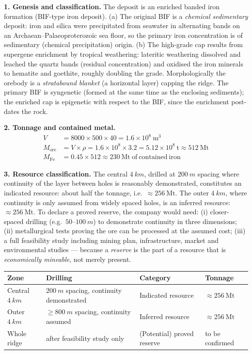 \documentclass[11pt]{article}
\newcommand{\cle}[1]{{\popxbold\color{popdark}#1}}
\newcounter{popsec}
\newcounter{popsub}
\newcommand{\courssub}[1]{%
  \stepcounter{popsub}%
  \par\vspace{9pt}\noindent{\popxbold\fontsize{11.5}{13}\selectfont\color{popink}{\color{poporange}\thepopsec.\thepopsub}\hspace{6pt}#1}\par\nopagebreak\vspace{4pt}
}
\begin{document}
\courssub{Model answer}

\textbf{1. Genesis and classification.} The deposit is an \cle{enriched banded iron formation} (BIF-type iron deposit). (a) The original BIF is a \emph{chemical sedimentary} deposit: iron and silica were precipitated from seawater in alternating bands on an Archaean--Palaeoproterozoic sea floor, so the primary iron concentration is of \cle{sedimentary (chemical precipitation)} origin. (b) The high-grade cap results from \cle{supergene enrichment by tropical weathering}: lateritic weathering dissolved and leached the quartz bands (residual concentration) and oxidised the iron minerals to hematite and goethite, roughly doubling the grade. Morphologically the orebody is a \emph{stratabound blanket} (a horizontal layer) capping the ridge. The primary BIF is \cle{syngenetic} (formed at the same time as the enclosing sediments); the enriched cap is \cle{epigenetic} with respect to the BIF, since the enrichment post-dates the rock.

\textbf{2. Tonnage and contained metal.}
\begin{align*}
V &= 8000 \times 500 \times 40 = 1.6\times 10^{8}\ \mathrm{m^{3}}\\
M_{\text{ore}} &= V \times \rho = 1.6\times 10^{8} \times 3.2 = 5.12\times 10^{8}\ \mathrm{t} \approx 512\ \mathrm{Mt}\\
M_{\text{Fe}} &= 0.45 \times 512 \approx 230\ \mathrm{Mt\ of\ contained\ iron}
\end{align*}

\textbf{3. Resource classification.} The central $\SI{4}{km}$, drilled at $\SI{200}{m}$ spacing where continuity of the layer between holes is reasonably demonstrated, constitutes an \cle{indicated resource}: about half the tonnage, i.e.\ $\approx 256\ \mathrm{Mt}$. The outer $\SI{4}{km}$, where continuity is only assumed from widely spaced holes, is an \cle{inferred resource}: $\approx 256\ \mathrm{Mt}$. To declare a \cle{proved reserve}, the company would need: (i) closer-spaced drilling (e.g.\ $50$--$\SI{100}{m}$) to demonstrate continuity in three dimensions; (ii) metallurgical tests proving the ore can be processed at the assumed cost; (iii) a full feasibility study including mining plan, infrastructure, market and environmental studies --- because a \emph{reserve} is the part of a resource that is \emph{economically mineable}, not merely present.

\begin{center}
\begin{tabularx}{\linewidth}{|l|X|X|X|}
\hline
\rowcolor{popblueL} \textbf{Zone} & \textbf{Drilling} & \textbf{Category} & \textbf{Tonnage} \\
\hline
Central $\SI{4}{km}$ & $\SI{200}{m}$ spacing, continuity demonstrated & Indicated resource & $\approx 256\ \mathrm{Mt}$ \\
\hline
Outer $\SI{4}{km}$ & $\geq \SI{800}{m}$ spacing, continuity assumed & Inferred resource & $\approx 256\ \mathrm{Mt}$ \\
\hline
Whole ridge & after feasibility study only & (Potential) proved reserve & to be confirmed \\
\hline
\end{tabularx}
\end{center}
\end{document}

